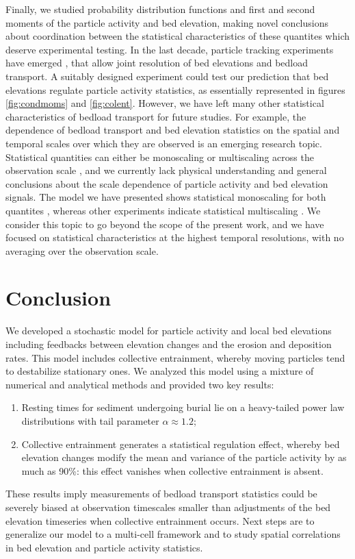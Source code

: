 Finally, we studied probability distribution functions and first and second moments of the particle activity and bed elevation, making novel conclusions about coordination between the statistical characteristics of these quantites which deserve experimental testing.
In the last decade, particle tracking experiments have emerged \citep{Lajeunesse2010,Roseberry2012,Martin2014, Fathel2015,Heyman2016,Liu2019}, that allow joint resolution of bed elevations and bedload transport. 
A suitably designed experiment could test our prediction that bed elevations regulate particle activity statistics, as essentially represented in figures \ref{fig:condmoms} and \ref{fig:colent}. 
However, we have left many other statistical characteristics of bedload transport for future studies. 
For example, the dependence of bedload transport \citep{Saletti2015a,Singh2009} and bed elevation statistics \citep{Aberle2006, Singh2009,Singh2012} on the spatial and temporal scales over which they are observed is an emerging research topic. Statistical quantities can either be monoscaling or multiscaling across the observation scale \citep{Sornette2000}, and we currently lack physical understanding and general conclusions about the scale dependence of particle activity and bed elevation signals.
The model we have presented shows statistical monoscaling for both quantites \citep[e.g.][]{Saletti2015a}, whereas other experiments indicate statistical multiscaling \citep{Aberle2006,Singh2009,Singh2012}. We consider this topic to go beyond the scope of the present work, and we have focused on statistical characteristics at the highest temporal resolutions, with no averaging over the observation scale.

\section{Conclusion}
\label{sec:conclusion}

We developed a stochastic model for particle activity and local bed elevations including feedbacks between elevation changes and the erosion and deposition rates.
This model includes collective entrainment, whereby moving particles tend to destabilize stationary ones.
We analyzed this model using a mixture of numerical and analytical methods and provided two key results:
\begin{enumerate}
	\item Resting times for sediment undergoing burial lie on a heavy-tailed power law distributions with tail parameter $\alpha \approx 1.2$;
	\item Collective entrainment generates a statistical regulation effect, whereby bed elevation changes modify the mean and variance of the particle activity by as much as 90\%: this effect vanishes when collective entrainment is absent.
\end{enumerate}
These results imply measurements of bedload transport statistics could be severely biased at observation timescales smaller than adjustments of the bed elevation timeseries when collective entrainment occurs.
Next steps are to generalize our model to a multi-cell framework and to study spatial correlations in bed elevation and particle activity statistics.
